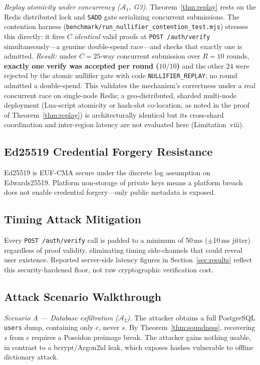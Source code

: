 \documentclass[journal,twoside,10pt]{IEEEtran}
\begin{document}
\textit{Replay atomicity under concurrency ($\mathcal{A}_1$, G3).}
Theorem~\ref{thm:replay} rests on the Redis distributed lock and
\texttt{SADD} gate serializing concurrent submissions. The contention
harness (\texttt{benchmark/\allowbreak run\_nullifier\_\allowbreak contention\_test.mjs})
stresses this directly: it fires $C$ \emph{identical} valid proofs at
\texttt{POST /auth/verify} simultaneously---a genuine double-spend
race---and checks that exactly one is admitted. \emph{Result:} under
$C{=}25$-way concurrent submission over $R{=}10$ rounds, \textbf{exactly one
verify was accepted per round ($10/10$)} and the other $24$ were rejected by
the atomic nullifier gate with code \texttt{NULLIFIER\_REPLAY}; no round
admitted a double-spend. This validates the mechanism's correctness
under a real concurrent race on single-node Redis; a geo-distributed,
sharded multi-node deployment (Lua-script atomicity or hash-slot
co-location, as noted in the proof of Theorem~\ref{thm:replay}) is
architecturally identical but its cross-shard coordination and inter-region
latency are not evaluated here (Limitation~viii).

\subsection{Ed25519 Credential Forgery Resistance}
Ed25519 is EUF-CMA secure under the discrete log assumption on Edwards25519.
Platform non-storage of private keys means a platform breach does not
enable credential forgery---only public metadata is exposed.

\subsection{Timing Attack Mitigation}
Every \texttt{POST /auth/verify} call is padded to a minimum of 50\,ms
($\pm$10\,ms jitter) regardless of proof validity, eliminating timing
side-channels that could reveal user existence. Reported server-side latency
figures in Section~\ref{sec:results} reflect this security-hardened floor,
not raw cryptographic verification cost.

\subsection{Attack Scenario Walkthrough}
\textit{Scenario A --- Database exfiltration ($\mathcal{A}_2$).} The attacker
obtains a full PostgreSQL \texttt{users} dump, containing only $c$, never
$s$. By Theorem~\ref{thm:soundness}, recovering $s$ from $c$ requires a
Poseidon preimage break. The attacker gains nothing usable, in contrast to
a bcrypt/Argon2id leak, which exposes hashes vulnerable to offline
dictionary attack.
\end{document}
